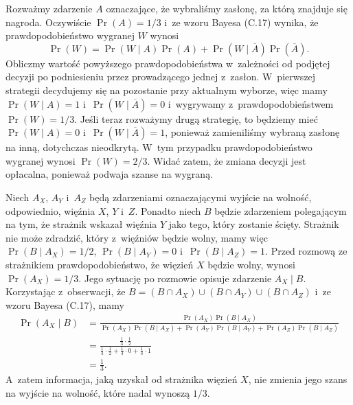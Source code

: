 \exercise %
Rozważmy zdarzenie $A$ oznaczające, że wybraliśmy zasłonę, za którą znajduje się nagroda.
Oczywiście $\Pr(A)=1/3$ i~ze wzoru Bayesa (C.17) wynika, że prawdopodobieństwo wygranej $W$ wynosi
\[
	\Pr(W) = \Pr(W\mid A)\Pr(A)+\Pr(W\mid\overline{A})\Pr(\overline{A}).
\]
Obliczmy wartość powyższego prawdopodobieństwa w~zależności od podjętej decyzji po podniesieniu przez prowadzącego jednej z~zasłon.
W~pierwszej strategii decydujemy się na pozostanie przy aktualnym wyborze, więc mamy $\Pr(W\mid A)=1$ i~$\Pr(W\mid\overline{A})=0$ i~wygrywamy z~prawdopodobieństwem $\Pr(W)=1/3$.
Jeśli teraz rozważymy drugą strategię, to będziemy mieć $\Pr(W\mid A)=0$ i~$\Pr(W\mid\overline{A})=1$, ponieważ zamieniliśmy wybraną zasłonę na inną, dotychczas nieodkrytą.
W~tym przypadku prawdopodobieństwo wygranej wynosi $\Pr(W)=2/3$.
Widać zatem, że zmiana decyzji jest opłacalna, ponieważ podwaja szanse na wygraną.

\exercise %
Niech $A_X$, $A_Y$ i~$A_Z$ będą zdarzeniami oznaczającymi wyjście na wolność, odpowiednio, więźnia $X$, $Y$ i~$Z$.
Ponadto niech $B$ będzie zdarzeniem polegającym na tym, że strażnik wskazał więźnia $Y$ jako tego, który zostanie ścięty.
Strażnik nie może zdradzić, który z~więźniów będzie wolny, mamy więc $\Pr(B\mid A_X)=1/2$, $\Pr(B\mid A_Y)=0$ i~$\Pr(B\mid A_Z)=1$.
Przed rozmową ze strażnikiem prawdopodobieństwo, że więzień $X$ będzie wolny, wynosi $\Pr(A_X)=1/3$.
Jego sytuację po rozmowie opisuje zdarzenie $A_X\mid B$.
Korzystając z~obserwacji, że $B=(B\cap A_X)\cup(B\cap A_Y)\cup(B\cap A_Z)$ i~ze wzoru Bayesa (C.17), mamy
\begin{align*}
    \Pr(A_X\mid B) &= \frac{\Pr(A_X)\Pr(B\mid A_X)}{\Pr(A_X)\Pr(B\mid A_X)+\Pr(A_Y)\Pr(B\mid A_Y)+\Pr(A_Z)\Pr(B\mid A_Z)} \\
	&= \frac{\frac{1}{3}\cdot\frac{1}{2}}{\frac{1}{3}\cdot\frac{1}{2}+\frac{1}{3}\cdot0+\frac{1}{3}\cdot1} \\[2mm]
	&= \frac{1}{3}.
\end{align*}
A~zatem informacja, jaką uzyskał od strażnika więzień $X$, nie zmienia jego szans na wyjście na wolność, które nadal wynoszą $1/3$.
